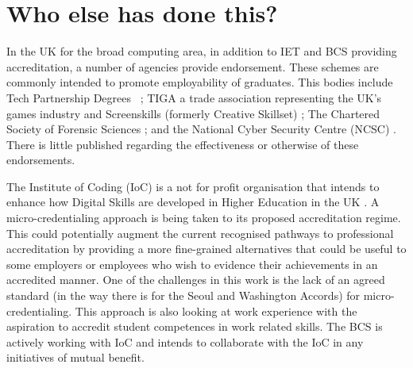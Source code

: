 \documentclass[sigconf]{acmart}
\begin{document}
\section {Who else has done this?}	

In the UK for the broad computing area, in addition to IET and BCS
providing accreditation, a number of agencies provide
endorsement. These schemes are commonly intended to promote
employability of graduates. This bodies include Tech Partnership
Degrees ~\cite{TP2019}; TIGA a trade association representing the UK's
games industry and Screenskills (formerly Creative Skillset)
\cite{Screenskills2019}; The Chartered Society of Forensic Sciences
\cite{CSOFS2019}; and the National Cyber Security Centre (NCSC)
\cite{NCSC2018a}. There is little published regarding the
effectiveness or otherwise of these endorsements.

\begin{comment}

In addition to IET and BCS, accreditation in the broad computing area in the UK is also being performed by a few different agencies. A number of bodies are providing endorsements intended to promote employability. Tech Partnership Degrees provides endorsements to Higher Education programmes with specific curricula elements aimed at job market requirements \cite{TP2019}. Tech Partnership Degrees have a specialist scope, endorsing programmes in the area of IT Management for Business and Software Engineering for Business. For games related degrees, TIGA a trade association representing the UK's games industry and  Screenskills (formerly Creative Skillset) \cite{Screenskills2019} operate a similar role. For digital forensics The Chartered Society of Forensic Sciences \cite{CSOFS2019} provides industry related endorsements.  National Cyber Security Centre (NCSC) is a UK Government organisation tasked with enhancing the cybersecurity of the UK and accredits programmes with significant cybersecurity content \cite{NCSC2018a}. There is little published regarding the effectiveness or otherwise of these endorsements.

\end{comment}

The Institute of Coding (IoC) is a not for profit organisation that intends to enhance how Digital Skills are developed in Higher Education in the UK \cite{Davenportetal2019a}. A micro-credentialing approach is being taken to its proposed accreditation regime. This could potentially augment the current recognised pathways to professional accreditation by providing a more fine-grained alternatives that could be useful to some employers or employees who wish to evidence their achievements in an accredited manner.  One of the challenges in this work is the lack of an agreed standard (in the way there is for the Seoul and Washington Accords) for micro-credentialing. This approach is also looking at work experience with the aspiration to accredit student competences in work related skills. The BCS is actively working with IoC and intends to collaborate with the IoC in any initiatives of mutual benefit.
\end{document}
